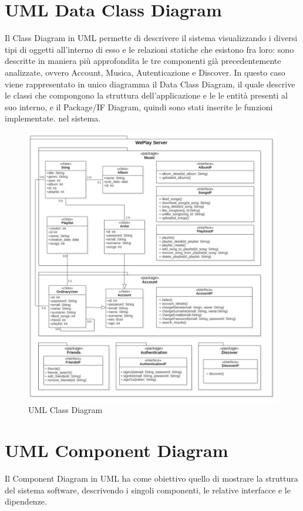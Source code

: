 \section{UML Data Class Diagram}
Il Class Diagram in UML permette di descrivere il sistema 
visualizzando i diversi tipi di oggetti all'interno di esso e le relazioni 
statiche che esistono fra loro: sono descritte in maniera più approfondita 
le tre componenti già precedentemente analizzate, ovvero Account, Musica, 
Autenticazione e Discover.
In questo caso viene rappresentato in unico diagramma il Data Class Diagram, 
il quale descrive le classi che compongono la struttura dell'applicazione e le
le entità presenti al suo interno, e il Package/IF Diagram, quindi sono stati
inserite le funzioni implementate. 
nel sistema.
\begin{figure}[H]
    \centering
    \includegraphics[scale=0.4]{images/ClassDiagram_ver5.jpg}
    \caption{UML Class Diagram}
    \label{fig-uml-class-diag}
\end{figure}
\newpage

\section{UML Component Diagram}
Il Component Diagram in UML ha come obiettivo quello di mostrare la struttura
del sistema software, descrivendo i singoli componenti, le relative interfacce 
e le dipendenze. 

